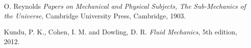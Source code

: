 \begin{thebibliography}{56}

  O. Reynolds
  \emph{Papers on Mechanical and Physical Subjects, The Sub-Mechanics of the Universe},
  Cambridge University Press, Cambridge,
  1903.


  Kundu, P. K., Cohen, I. M. and Dowling, D. R.
  \emph{Fluid Mechanics},
  5th edition,
  2012.

\end{thebibliography}

